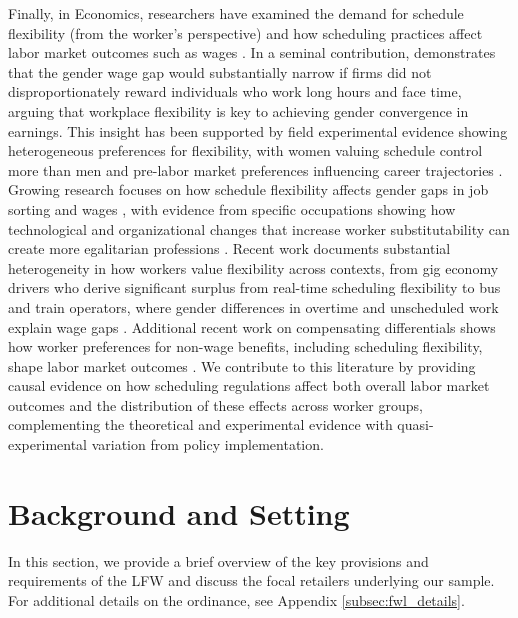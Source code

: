 \documentclass[letterpaper,11pt,leqno]{article}
\theoremstyle{paper}
\begin{document}
Finally, in Economics, researchers have examined the demand for schedule flexibility (from the worker's perspective) and how scheduling practices affect labor market outcomes such as wages \citep{Maestas2023ValueOfWorkingConditions,mas2017valuing,mas2020alternative,wiswall2018preference}. In a seminal contribution, \cite{goldin2014grand} demonstrates that the gender wage gap would substantially narrow if firms did not disproportionately reward individuals who work long hours and face time, arguing that workplace flexibility is key to achieving gender convergence in earnings. This insight has been supported by field experimental evidence showing heterogeneous preferences for flexibility, with women valuing schedule control more than men \citep{mas2017valuing} and pre-labor market preferences influencing career trajectories \citep{wiswall2018preference}. Growing research focuses on how schedule flexibility affects gender gaps in job sorting and wages \citep{goldin2011cost,goldin2021career,goldin2024parental}, with evidence from specific occupations showing how technological and organizational changes that increase worker substitutability can create more egalitarian professions \citep{goldin2016most}. Recent work documents substantial heterogeneity in how workers value flexibility across contexts, from gig economy drivers who derive significant surplus from real-time scheduling flexibility \citep{chen2019value} to bus and train operators, where gender differences in overtime and unscheduled work explain wage gaps \citep{bolotnyy2022why}. Additional recent work on compensating differentials shows how worker preferences for non-wage benefits, including scheduling flexibility, shape labor market outcomes \citep{lamadon2022imperfect,lavetti2023compensating}. We contribute to this literature by providing causal evidence on how scheduling regulations affect both overall labor market outcomes and the distribution of these effects across worker groups, complementing the theoretical and experimental evidence with quasi-experimental variation from policy implementation.



\section{Background and Setting} \label{sec:background}

In this section, we provide a brief overview of the key provisions and requirements of the LFW and discuss the focal retailers underlying our sample. For additional details on the ordinance, see Appendix \ref{subsec:fwl_details}.
\end{document}
